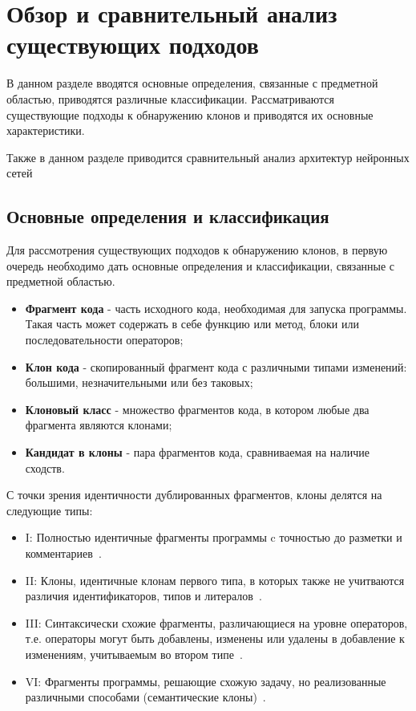 \chapter{Обзор и сравнительный анализ существующих подходов}
В данном разделе вводятся основные определения, связанные с предметной областью, приводятся различные классификации. Рассматриваются существующие подходы к обнаружению клонов и приводятся их основные характеристики.

Также в данном разделе приводится сравнительный анализ архитектур нейронных сетей
\section{Основные определения и классификация}

Для рассмотрения существующих подходов к обнаружению клонов, в первую очередь необходимо дать основные определения и классификации, связанные с предметной областью. 

\begin{itemize}
\setlength\itemsep{0mm}
\item \textbf{Фрагмент кода} - часть исходного кода, необходимая для запуска программы. Такая часть может содержать в себе функцию или метод, блоки или последовательности операторов;
\item \textbf{Клон кода} - скопированный фрагмент кода с различными типами изменений: большими, незначительными или без таковых;
\item \textbf{Клоновый класс} - множество фрагментов кода, в котором любые два фрагмента являются клонами;
\item \textbf{Кандидат в клоны} - пара фрагментов кода, сравниваемая на наличие сходств.
\end{itemize}

С точки зрения идентичности дублированных фрагментов, клоны делятся на следующие типы:
\begin{itemize}
\setlength\itemsep{0mm}
\item I: Полностью идентичные фрагменты программы c точностью до разметки и комментариев~\cite{akhinitsykson, surveyroyandcordy}.
\item II: Клоны, идентичные клонам первого типа, в которых также не учитваются различия идентификаторов, типов и литералов~\cite{akhinitsykson, surveyroyandcordy}.
\item III: Синтаксически схожие фрагменты, различающиеся на уровне операторов, т.е. операторы могут быть добавлены, изменены или удалены в добавление к изменениям, учитываемым во втором типе~\cite{akhinitsykson, surveyroyandcordy}.
\item VI: Фрагменты программы, решающие схожую задачу, но реализованные различными способами (семантические клоны)~\cite{akhinitsykson, surveyroyandcordy}.
\end{itemize}

